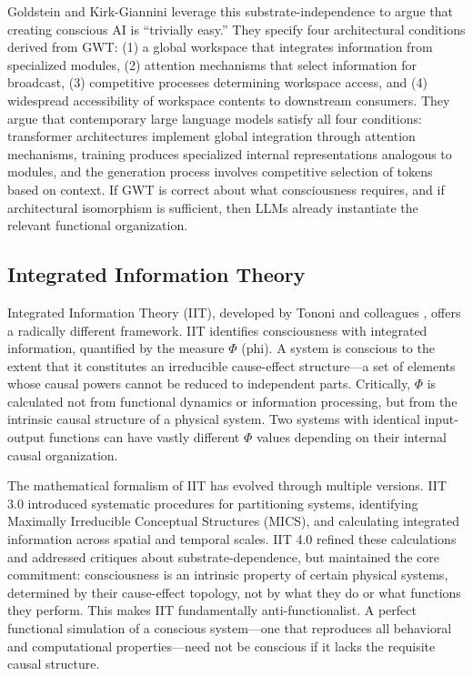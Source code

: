 Goldstein and Kirk-Giannini \cite{goldstein2024case} leverage this substrate-independence
to argue that creating conscious AI is ``trivially easy.'' They specify four architectural
conditions derived from GWT: (1) a global workspace that integrates information from
specialized modules, (2) attention mechanisms that select information for broadcast,
(3) competitive processes determining workspace access, and (4) widespread accessibility
of workspace contents to downstream consumers. They argue that contemporary large language
models satisfy all four conditions: transformer architectures implement global integration
through attention mechanisms, training produces specialized internal representations
analogous to modules, and the generation process involves competitive selection of tokens
based on context. If GWT is correct about what consciousness requires, and if architectural
isomorphism is sufficient, then LLMs already instantiate the relevant functional organization.

\subsection{Integrated Information Theory}

Integrated Information Theory (IIT), developed by Tononi and colleagues
\cite{tononi2004information,tononi2016integrated,albantakis2023iit4}, offers a radically
different framework. IIT identifies consciousness with integrated information, quantified
by the measure $\Phi$ (phi). A system is conscious to the extent that it constitutes an
irreducible cause-effect structure---a set of elements whose causal powers cannot be reduced
to independent parts. Critically, $\Phi$ is calculated not from functional dynamics or
information processing, but from the intrinsic causal structure of a physical system. Two
systems with identical input-output functions can have vastly different $\Phi$ values
depending on their internal causal organization.

The mathematical formalism of IIT has evolved through multiple versions. IIT 3.0
\cite{oizumi2014phenomenology} introduced systematic procedures for partitioning systems,
identifying Maximally Irreducible Conceptual Structures (MICS), and calculating integrated
information across spatial and temporal scales. IIT 4.0 \cite{albantakis2023iit4} refined
these calculations and addressed critiques about substrate-dependence, but maintained the
core commitment: consciousness is an intrinsic property of certain physical systems,
determined by their cause-effect topology, not by what they do or what functions they
perform. This makes IIT fundamentally anti-functionalist. A perfect functional simulation
of a conscious system---one that reproduces all behavioral and computational
properties---need not be conscious if it lacks the requisite causal structure.

